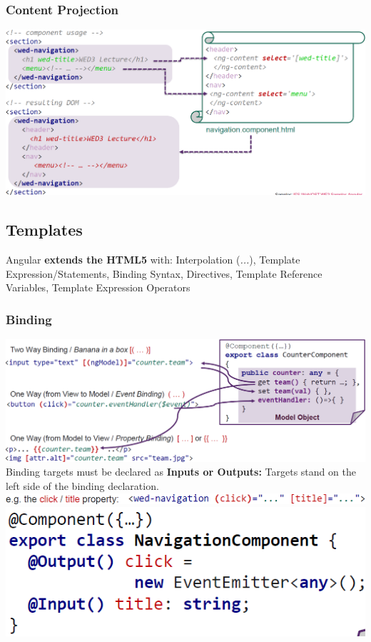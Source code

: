 \subsubsection{Content Projection}
\includegraphics[width=\linewidth]{img/angular_content_projection.png}

\subsection{Templates}
 Angular \textbf{extends the HTML5} with:
Interpolation (\textit{{{...}}}),
Template Expression/Statements,
Binding Syntax,
Directives,
Template Reference Variables,
Template Expression Operators

\subsubsection{Binding}
\includegraphics[width=\linewidth]{img/angular_bindings.png}
Binding targets must be declared as \textbf{Inputs or Outputs:} Targets stand on the left side of the binding declaration.
\includegraphics[width=\linewidth]{img/angular_input_output_properties.png}
\includegraphics[width=0.5\linewidth]{img/angular_input_output_properties2.png}

